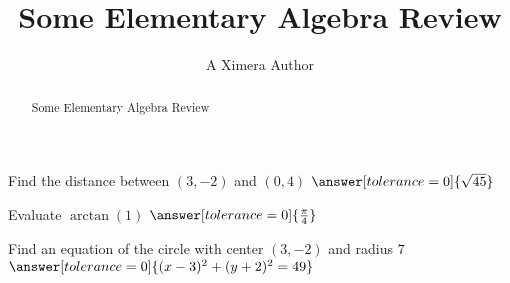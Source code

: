 \documentclass{ximera}
\title{Some Elementary Algebra Review}
\author{A Ximera Author}
\begin{document}
\begin{abstract}
Some Elementary Algebra Review
\end{abstract}

\maketitle

\begin{problem}
   Find the distance between $(3, -2)$ and $(0, 4)$ $\answer[tolerance=0]{\sqrt{45}}$
\end{problem}

\begin{problem}
   Evaluate $\arctan(1)$ $\answer[tolerance=0]{\frac{\pi}{4}}$
\end{problem}

\begin{problem}
   Find an equation of the circle with center $(3, -2)$ and radius $7$ $\answer[tolerance=0]{(x - 3)^2 + (y + 2)^2 = 49}$
\end{problem}
\end{document}
